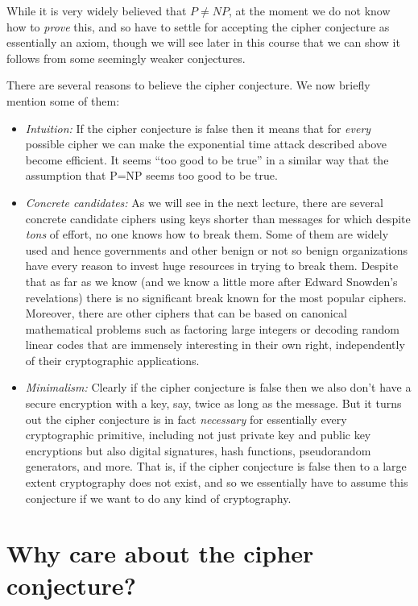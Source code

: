 While it is very widely believed that
\(P\neq \ensuremath{\mathit{NP}}\), at the moment we do not know how to
\emph{prove} this, and so have to settle for accepting the cipher
conjecture as essentially an axiom, though we will see later in this
course that we can show it follows from some seemingly weaker
conjectures.

There are several reasons to believe the cipher conjecture. We now
briefly mention some of them:

\begin{itemize}
\item
  \emph{Intuition:} If the cipher conjecture is false then it means that
  for \emph{every} possible cipher we can make the exponential time
  attack described above become efficient. It seems ``too good to be
  true'' in a similar way that the assumption that P=NP seems too good
  to be true.
\item
  \emph{Concrete candidates:} As we will see in the next lecture, there
  are several concrete candidate ciphers using keys shorter than
  messages for which despite \emph{tons} of effort, no one knows how to
  break them. Some of them are widely used and hence governments and
  other benign or not so benign organizations have every reason to
  invest huge resources in trying to break them. Despite that as far as
  we know (and we know a little more after Edward Snowden's revelations)
  there is no significant break known for the most popular ciphers.
  Moreover, there are other ciphers that can be based on canonical
  mathematical problems such as factoring large integers or decoding
  random linear codes that are immensely interesting in their own right,
  independently of their cryptographic applications.
\item
  \emph{Minimalism:} Clearly if the cipher conjecture is false then we
  also don't have a secure encryption with a key, say, twice as long as
  the message. But it turns out the cipher conjecture is in fact
  \emph{necessary} for essentially every cryptographic primitive,
  including not just private key and public key encryptions but also
  digital signatures, hash functions, pseudorandom generators, and more.
  That is, if the cipher conjecture is false then to a large extent
  cryptography does not exist, and so we essentially have to assume this
  conjecture if we want to do any kind of cryptography.
\end{itemize}

\section{Why care about the cipher
conjecture?}\label{Why-care-about-the-cipher}

